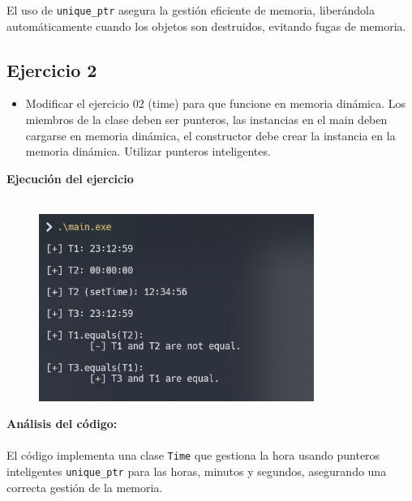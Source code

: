 \documentclass{article}
\begin{document}
        El uso de \texttt{unique\_ptr} asegura la gestión eficiente de memoria, liberándola automáticamente cuando los objetos son destruidos, evitando fugas de memoria.
        

    \subsection{Ejercicio 2}
        \begin{itemize}
            \item Modificar el ejercicio 02 (time) para que funcione en memoria dinámica. Los miembros de la clase deben ser punteros, las instancias en el main deben cargarse en memoria dinámica, el constructor debe crear la instancia en la memoria dinámica. Utilizar punteros inteligentes.
        \end{itemize}  
        
        

        
        
        

        \textbf{Ejecución del ejercicio} \\\\
        \begin{figure}[H]
        	\centering
         	\includegraphics[width=0.8\textwidth,keepaspectratio]{img/ejercicio2.png}
        \end{figure}

        \textbf{Análisis del código:}  \\\\
        El código implementa una clase \texttt{Time} que gestiona la hora usando punteros inteligentes \texttt{unique\_ptr} para las horas, minutos y segundos, asegurando una correcta gestión de la memoria.
        
\end{document}
